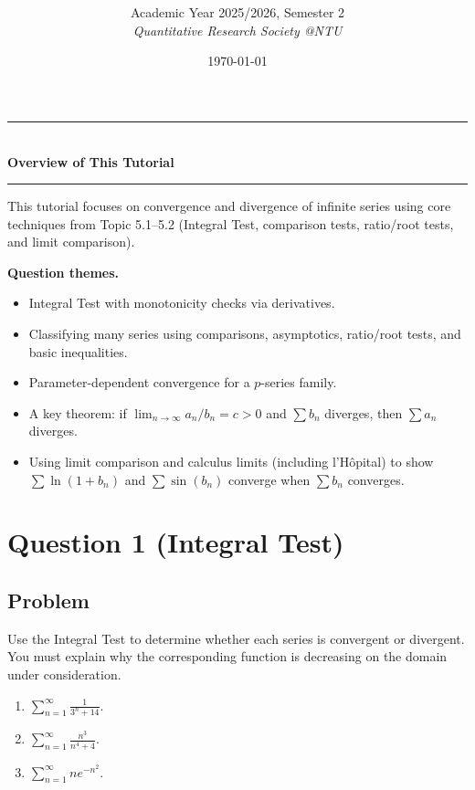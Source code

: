 \documentclass[12pt]{article}
\title{
\CourseCode \CourseName \\[0.3em]
\large \DocType
}
\author{
  Academic Year 2025/2026, Semester 2 \\[0.25em]
  \textit{Quantitative Research Society @NTU}
}
\date{\today}
\newcommand{\ds}{\displaystyle}
\begin{document}
\maketitle
\thispagestyle{plainfirst}
\pagestyle{main}
\bigskip

\begin{center}
  \rule{0.8\textwidth}{0.4pt}\\[4pt]
  \textbf{Overview of This Tutorial}\\[2pt]
  \rule{0.8\textwidth}{0.4pt}
\end{center}

\noindent
This tutorial focuses on convergence and divergence of infinite series using core techniques from Topic 5.1--5.2 (Integral Test, comparison tests, ratio/root tests, and limit comparison).

\noindent
\textbf{Question themes.}
\begin{itemize}[leftmargin=*]
  \item Integral Test with monotonicity checks via derivatives.
  \item Classifying many series using comparisons, asymptotics, ratio/root tests, and basic inequalities.
  \item Parameter-dependent convergence for a \(p\)-series family.
  \item A key theorem: if \(\lim_{n\to\infty} a_n/b_n = c>0\) and \(\sum b_n\) diverges, then \(\sum a_n\) diverges.
  \item Using limit comparison and calculus limits (including l'H\^opital) to show \(\sum \ln(1+b_n)\) and \(\sum \sin(b_n)\) converge when \(\sum b_n\) converges.
\end{itemize}

\bigskip

\newpage
\section*{Question 1 (Integral Test)}
\subsection*{Problem}
Use the Integral Test to determine whether each series is convergent or divergent. You must explain why the corresponding function is decreasing on the domain under consideration.
\begin{enumerate}[label=(\alph*)]
  \item \(\ds \sum_{n=1}^{\infty}\frac{1}{3^n+14}\).
  \item \(\ds \sum_{n=1}^{\infty}\frac{n^3}{n^4+4}\).
  \item \(\ds \sum_{n=1}^{\infty} n e^{-n^2}\).
\end{enumerate}
\end{document}
